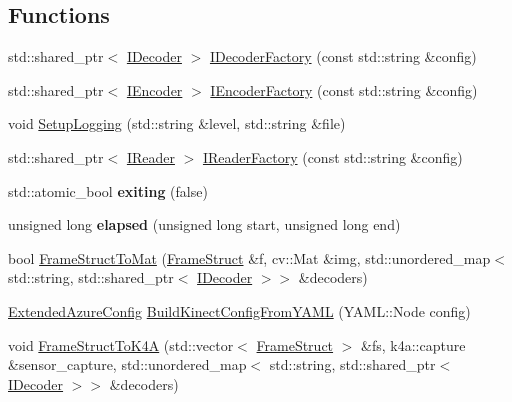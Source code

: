 \subsection*{Functions}
\begin{DoxyCompactItemize}
\item 
std\+::shared\+\_\+ptr$<$ \hyperlink{classmoetsi_1_1ssp_1_1IDecoder}{I\+Decoder} $>$ \hyperlink{namespacemoetsi_1_1ssp_a9478a722eaeec487c7288ed18c9a06bc}{I\+Decoder\+Factory} (const std\+::string \&config)
\item 
std\+::shared\+\_\+ptr$<$ \hyperlink{classmoetsi_1_1ssp_1_1IEncoder}{I\+Encoder} $>$ \hyperlink{namespacemoetsi_1_1ssp_a7e5e01bac9a0fade08d2b71d1c16bcbe}{I\+Encoder\+Factory} (const std\+::string \&config)
\item 
void \hyperlink{namespacemoetsi_1_1ssp_a0af356ab87e92f92c49e7118b9cb1ba2}{Setup\+Logging} (std\+::string \&level, std\+::string \&file)
\item 
std\+::shared\+\_\+ptr$<$ \hyperlink{classmoetsi_1_1ssp_1_1IReader}{I\+Reader} $>$ \hyperlink{namespacemoetsi_1_1ssp_ad5e820c4c6a1a43d5e85608a06b86ea8}{I\+Reader\+Factory} (const std\+::string \&config)
\item 
\mbox{\label{namespacemoetsi_1_1ssp_a316383e8c51e6cb5f67a013bd0311bb8}} 
std\+::atomic\+\_\+bool {\bfseries exiting} (false)
\item 
\mbox{\label{namespacemoetsi_1_1ssp_a884aae59668e7913051f2875b047688e}} 
unsigned long {\bfseries elapsed} (unsigned long start, unsigned long end)
\item 
bool \hyperlink{namespacemoetsi_1_1ssp_ac87377cef5da79f1a9cf7a4acdc42af6}{Frame\+Struct\+To\+Mat} (\hyperlink{structmoetsi_1_1ssp_1_1FrameStruct}{Frame\+Struct} \&f, cv\+::\+Mat \&img, std\+::unordered\+\_\+map$<$ std\+::string, std\+::shared\+\_\+ptr$<$ \hyperlink{classmoetsi_1_1ssp_1_1IDecoder}{I\+Decoder} $>$$>$ \&decoders)
\item 
\hyperlink{structmoetsi_1_1ssp_1_1ExtendedAzureConfig}{Extended\+Azure\+Config} \hyperlink{namespacemoetsi_1_1ssp_a357441ccde272e5d06fb708b62efa5c1}{Build\+Kinect\+Config\+From\+Y\+A\+ML} (Y\+A\+M\+L\+::\+Node config)
\item 
void \hyperlink{namespacemoetsi_1_1ssp_a89dd4f75fe22e28fd724f4b90841ec02}{Frame\+Struct\+To\+K4A} (std\+::vector$<$ \hyperlink{structmoetsi_1_1ssp_1_1FrameStruct}{Frame\+Struct} $>$ \&fs, k4a\+::capture \&sensor\+\_\+capture, std\+::unordered\+\_\+map$<$ std\+::string, std\+::shared\+\_\+ptr$<$ \hyperlink{classmoetsi_1_1ssp_1_1IDecoder}{I\+Decoder} $>$$>$ \&decoders)

\end{DoxyCompactItemize}
